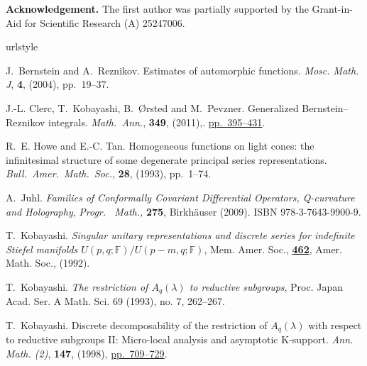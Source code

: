 \documentclass[reqno,12pt]{pja00} %
\theoremstyle{definition}
\theoremstyle{exampstyle} \newtheorem{examp}[theorem]{Theorem}
\begin{document}
	{\bf Acknowledgement.} The first author was partially supported by the Grant-in-Aid for Scientific Research (A) 25247006.
\nocite{kobayashi1998discrete2}
\nocite{kobayashi2015program}
\small
\begin{thebibliography}{99}
\expandafter\ifx\csname urlstyle\endcsname\relax
  \providecommand{\doi}[1]{doi:\discretionary{}{}{}#1}\else
  \providecommand{\doi}{doi:\discretionary{}{}{}\begingroup
  \urlstyle{rm}\Url}\fi

J.~Bernstein and A.~Reznikov.
\newblock Estimates of automorphic functions.
\newblock \emph{{\normalfont Mosc. Math. J}}, \textbf{\textbf{4}}, (2004),
  pp.~19--37.

J.-L. Clerc, T.~Kobayashi, B.~{\O}rsted and M.~Pevzner.
\newblock Generalized {B}ernstein--{R}eznikov integrals.
\newblock \emph{{\normalfont Math.~Ann.}}, \textbf{349}, (2011),.
\href{http://dx.doi.org/10.1007/s00208-010-0516-4}{pp.~395--431}.

R.~E. Howe and E.-C. Tan.
\newblock Homogeneous functions on light cones: the infinitesimal structure of
  some degenerate principal series representations.
\newblock \emph{{\normalfont Bull.~Amer.~Math.~Soc.}}, \textbf{28},
  (1993), pp.~1--74.

A.~Juhl.
\newblock \emph{Families of {C}onformally {C}ovariant {D}ifferential
  {O}perators, {Q}-curvature and {H}olography}, \emph{{\normalfont Progr.~ Math.},} \textbf{275},
\newblock Birkh{\"a}user (2009).
\newblock ISBN 978-3-7643-9900-9.

T.~Kobayashi.
\newblock \emph{Singular unitary representations and discrete series for indefinite Stiefel manifolds $U (p, q; \mathbb{F})/U (p-m, q; \mathbb{F})$},
Mem. Amer. Soc., \textbf{\href{http://www.ams.org/bookstore-getitem/item=MEMO-95-462}{462}}, Amer. Math. Soc., (1992).

\newblock
T.~Kobayashi. \emph{The restriction of $A_q \left( \lambda \right)$ to reductive subgroups},
Proc. Japan Acad. Ser. A Math. Sci. 69 (1993), no. 7, 262--267.

T.~Kobayashi.
\newblock Discrete decomposability of the restriction of {$A_q(\lambda)$} with
  respect to reductive subgroups {II}: Micro-local analysis and asymptotic
  {K}-support.
  \newblock \emph{{\normalfont Ann. Math. (2)}}, \textbf{147}, (1998),
\href{http://dx.doi.org/10.2307/120963}{pp.~709--729}.


\end{thebibliography}
\end{document}
